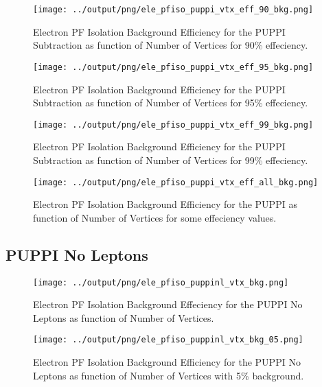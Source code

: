 \documentclass[11pt]{book}
\begin{document}
\begin{figure}[htb]
\centering
\texttt{[image: ../output/png/ele\_pfiso\_puppi\_vtx\_eff\_90\_bkg.png]}
\caption{Electron PF Isolation Background Efficiency for the PUPPI Subtraction as function of Number of Vertices for 90\% effeciency.}
\label{fig:ele_pfiso_vtx_eff_puppi_eff_90_bkg}
\end{figure}

\begin{figure}[htb]
\centering
\texttt{[image: ../output/png/ele\_pfiso\_puppi\_vtx\_eff\_95\_bkg.png]}
\caption{Electron PF Isolation Background Efficiency for the PUPPI Subtraction as function of Number of Vertices for 95\% effeciency.}
\label{fig:ele_pfiso_vtx_eff_puppi_eff_95_bkg}
\end{figure}

\begin{figure}[htb]
\centering
\texttt{[image: ../output/png/ele\_pfiso\_puppi\_vtx\_eff\_99\_bkg.png]}
\caption{Electron PF Isolation Background Efficiency for the PUPPI Subtraction as function of Number of Vertices for 99\% effeciency.}
\label{fig:ele_pfiso_vtx_eff_puppi_eff_99_bkg}
\end{figure}

\begin{figure}[htb]
\centering
\texttt{[image: ../output/png/ele\_pfiso\_puppi\_vtx\_eff\_all\_bkg.png]}
\caption{Electron PF Isolation Background Efficiency for the PUPPI as function of Number of Vertices for some effeciency values.}
\label{fig:ele_pfiso_vtx_eff_puppi_eff_all_bkg}
\end{figure}
\clearpage

\subsection{PUPPI No Leptons}
\begin{figure}[htb]
\centering
\texttt{[image: ../output/png/ele\_pfiso\_puppinl\_vtx\_bkg.png]}
\caption{Electron PF Isolation Background Effeciency for the PUPPI No Leptons as function of Number of Vertices.}
\label{fig:ele_pfiso_vtx_bkg_puppinl}
\end{figure}

\begin{figure}[htb]
\centering
\texttt{[image: ../output/png/ele\_pfiso\_puppinl\_vtx\_bkg\_05.png]}
\caption{Electron PF Isolation Background Efficiency for the PUPPI No Leptons as function of Number of Vertices with 5\% background.}
\label{fig:ele_pfiso_vtx_bkg_puppinl_bkg_05}
\end{figure}
\end{document}
